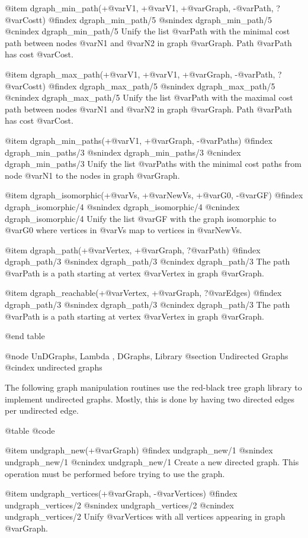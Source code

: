 {{{{{{{{{@item dgraph_min_path(+@var{V1}, +@var{V1}, +@var{Graph}, -@var{Path}, ?@var{Costt})
@findex  dgraph_min_path/5
@snindex dgraph_min_path/5
@cnindex dgraph_min_path/5
Unify the list @var{Path} with the minimal cost path between nodes
@var{N1} and @var{N2} in graph @var{Graph}. Path @var{Path} has cost
@var{Cost}.

@item dgraph_max_path(+@var{V1}, +@var{V1}, +@var{Graph}, -@var{Path}, ?@var{Costt})
@findex  dgraph_max_path/5
@snindex dgraph_max_path/5
@cnindex dgraph_max_path/5
Unify the list @var{Path} with the maximal cost path between nodes
@var{N1} and @var{N2} in graph @var{Graph}. Path @var{Path} has cost
@var{Cost}.

@item dgraph_min_paths(+@var{V1}, +@var{Graph}, -@var{Paths})
@findex  dgraph_min_paths/3
@snindex dgraph_min_paths/3
@cnindex dgraph_min_paths/3
Unify the list @var{Paths} with the minimal cost paths from node
@var{N1} to the nodes in graph @var{Graph}.

@item dgraph_isomorphic(+@var{Vs}, +@var{NewVs}, +@var{G0}, -@var{GF})
@findex  dgraph_isomorphic/4
@snindex dgraph_isomorphic/4
@cnindex dgraph_isomorphic/4
Unify the list @var{GF} with the graph isomorphic to @var{G0} where 
vertices in @var{Vs} map to vertices in @var{NewVs}.

@item dgraph_path(+@var{Vertex}, +@var{Graph}, ?@var{Path})
@findex  dgraph_path/3
@snindex dgraph_path/3
@cnindex dgraph_path/3
The path @var{Path} is a path starting at vertex @var{Vertex} in graph
@var{Graph}.

@item dgraph_reachable(+@var{Vertex}, +@var{Graph}, ?@var{Edges})
@findex  dgraph_path/3
@snindex dgraph_path/3
@cnindex dgraph_path/3
The path @var{Path} is a path starting at vertex @var{Vertex} in graph
@var{Graph}.

@end table

@node UnDGraphs, Lambda , DGraphs, Library
@section Undirected Graphs
@cindex undirected graphs

The following graph manipulation routines use the red-black tree graph
library to implement undirected graphs. Mostly, this is done by having
two directed edges per undirected edge.

@table @code

@item undgraph_new(+@var{Graph})
@findex  undgraph_new/1
@snindex undgraph_new/1
@cnindex undgraph_new/1
Create a new directed graph. This operation must be performed before
trying to use the graph.

@item undgraph_vertices(+@var{Graph}, -@var{Vertices})
@findex  undgraph_vertices/2
@snindex undgraph_vertices/2
@cnindex undgraph_vertices/2
Unify @var{Vertices} with all vertices appearing in graph
@var{Graph}.

}}}}}}}}}
